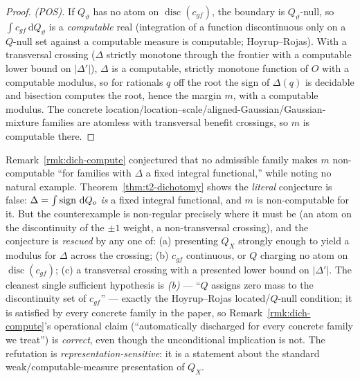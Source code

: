 \begin{proof}
\emph{(POS).} If $Q_\vartheta$ has no atom on $\operatorname{disc}(c_{gf})$, the boundary is
$Q_\vartheta$-null, so $\int c_{gf}\,\mathrm dQ_\vartheta$ is a \emph{computable} real
(integration of a function discontinuous only on a $Q$-null set against a computable measure is
computable; Hoyrup--Rojas). With a transversal crossing ($\Delta$ strictly monotone through the
frontier with a computable lower bound on $|\Delta'|$), $\Delta$ is a computable, strictly
monotone function of $O$ with a computable modulus, so for rationals $q$ off the root the sign
of $\Delta(q)$ is decidable and bisection computes the root, hence the margin $m$, with a
computable modulus. The concrete location/location--scale/aligned-Gaussian/Gaussian-mixture
families are atomless with transversal benefit crossings, so $m$ is computable there.
\end{proof}

\begin{remark}\label{rmk:t2-resolution}
Remark~\ref{rmk:dich-compute} conjectured that no admissible family makes $m$ non-computable
``for families with $\Delta$ a fixed integral functional,'' while noting no natural example.
Theorem~\ref{thm:t2-dichotomy} shows the \emph{literal} conjecture is false: $\Delta=\int\operatorname{sign}\,
\mathrm dQ_o$ \emph{is} a fixed integral functional, and $m$ is non-computable for it. But the
counterexample is non-regular precisely where it must be (an atom on the discontinuity of the
$\pm1$ weight, a non-transversal crossing), and the conjecture is \emph{rescued} by any one of:
(a) presenting $Q_X$ strongly enough to yield a modulus for $\Delta$ across the crossing;
(b) $c_{gf}$ continuous, or $Q$ charging no atom on $\operatorname{disc}(c_{gf})$; (c) a
transversal crossing with a presented lower bound on $|\Delta'|$. The cleanest single
sufficient hypothesis is \emph{(b)} --- ``$Q$ assigns zero mass to the discontinuity set of
$c_{gf}$'' --- exactly the Hoyrup--Rojas located/$Q$-null condition; it is satisfied by every
concrete family in the paper, so Remark~\ref{rmk:dich-compute}'s operational claim (``automatically
discharged for every concrete family we treat'') is \emph{correct}, even though the unconditional
implication is not. The refutation is \emph{representation-sensitive}: it is a statement about the
standard weak/computable-measure presentation of $Q_X$.
\end{remark}

